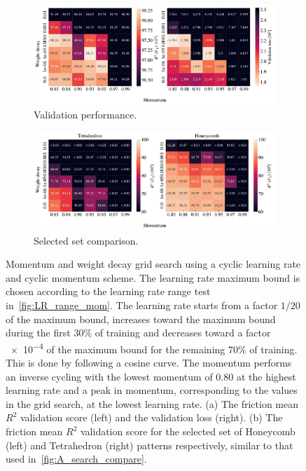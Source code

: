 \begin{figure}[!htb]
  \centering
  \begin{subfigure}[t]{1.0\textwidth}
      \centering
      \includegraphics[width=\textwidth]{figures/ML/mom_weight_search_cyclic_perf.pdf}
      \caption{Validation performance.}
  \end{subfigure}
  \hfill
  \begin{subfigure}[t]{1.0\textwidth}
      \centering
      \includegraphics[width=\textwidth]{figures/ML/mom_weight_search_compare_cyclic_perf.pdf}
      \caption{Selected set comparison.}
  \end{subfigure}
  \hfill
  \caption{Momentum and weight decay grid search using a cyclic learning rate and cyclic momentum scheme. The learning rate maximum bound is chosen according to the learning rate range test in~\cref{fig:LR_range_mom}. The learning rate starts from a factor $1/20$ of the maximum bound, increases toward the maximum bound during the first $30\%$ of training and decreases toward a factor \num{e-4} of the maximum bound for the remaining 70\% of training. This is done by following a cosine curve. The momentum performs an inverse cycling with the lowest momentum of 0.80 at the highest learning rate and a peak in momentum, corresponding to the values in the grid search, at the lowest learning rate. (a) The friction mean $R^2$ validation score (left) and the validation loss (right). (b) The friction mean $R^2$ validation score for the selected set of Honeycomb (left) and Tetrahedron (right) patterns respectively, similar to that used in~\cref{fig:A_search_compare}.}
  \label{fig:mom_weight_search_cyclic}
\end{figure}

